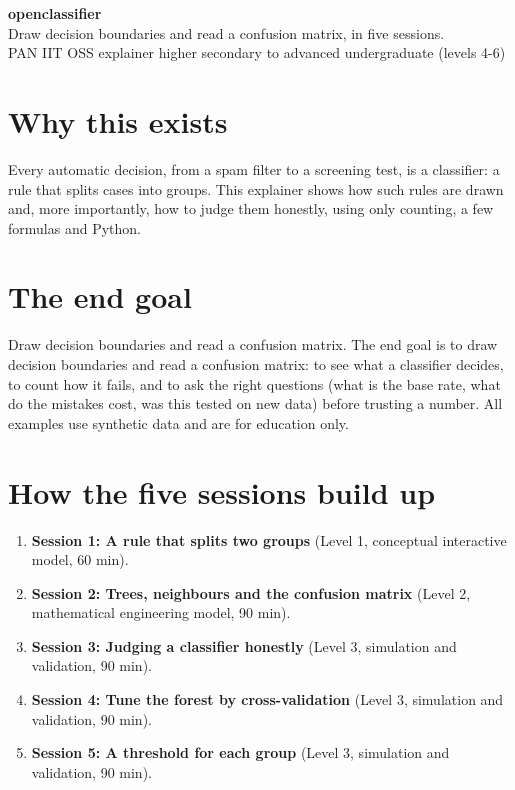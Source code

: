 \documentclass[11pt,a4paper]{article}
\begin{document}
\begin{center}{\LARGE\bfseries openclassifier}\\[0.4em]{\large Draw decision boundaries and read a confusion matrix, in five sessions.}\\[0.2em]\small PAN IIT OSS explainer \textbullet{} higher secondary to advanced undergraduate (levels 4-6)\end{center}

\section*{Why this exists}
Every automatic decision, from a spam filter to a screening test, is a classifier: a rule that splits cases into groups. This explainer shows how such rules are drawn and, more importantly, how to judge them honestly, using only counting, a few formulas and Python.

\section*{The end goal}
Draw decision boundaries and read a confusion matrix. The end goal is to draw decision boundaries and read a confusion matrix: to see what a classifier decides, to count how it fails, and to ask the right questions (what is the base rate, what do the mistakes cost, was this tested on new data) before trusting a number. All examples use synthetic data and are for education only.

\section*{How the five sessions build up}
\begin{enumerate}[nosep]
\item \textbf{Session 1: A rule that splits two groups} (Level 1, conceptual interactive model, 60 min).
\item \textbf{Session 2: Trees, neighbours and the confusion matrix} (Level 2, mathematical engineering model, 90 min).
\item \textbf{Session 3: Judging a classifier honestly} (Level 3, simulation and validation, 90 min).
\item \textbf{Session 4: Tune the forest by cross-validation} (Level 3, simulation and validation, 90 min).
\item \textbf{Session 5: A threshold for each group} (Level 3, simulation and validation, 90 min).
\end{enumerate}
\end{document}
